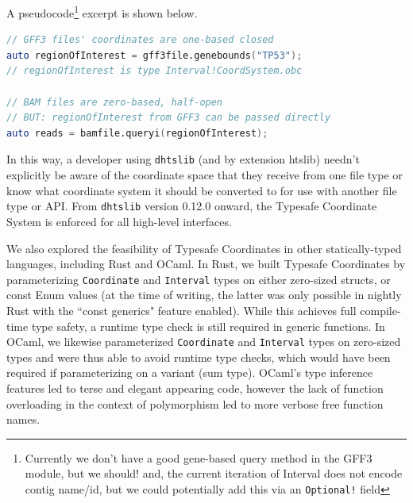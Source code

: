 \documentclass[12pt]{article}
\begin{document}
\filbreak
A pseudocode\footnote{Currently we don't have a good gene-based query method in the GFF3 module, but we should! and, the current iteration of Interval does not encode contig name/id, but we could potentially add this via an \texttt{Optional!} field} excerpt is shown below.\\

\begin{lstlisting}[language=D,frame=single,basicstyle=\ttfamily\small]
// GFF3 files' coordinates are one-based closed
auto regionOfInterest = gff3file.genebounds("TP53");
// regionOfInterest is type Interval!CoordSystem.obc

// BAM files are zero-based, half-open
// BUT: regionOfInterest from GFF3 can be passed directly
auto reads = bamfile.queryi(regionOfInterest);
\end{lstlisting}


In this way, a developer using \texttt{dhtslib} (and by extension htslib) needn't explicitly be aware of the coordinate space that they receive from one file type or know what coordinate system it should be converted to for use with another file type or API. From \texttt{dhtslib} version 0.12.0 onward, the Typesafe Coordinate System is enforced for all high-level interfaces.

We also explored the feasibility of Typesafe Coordinates in other statically-typed languages, including Rust and OCaml. In Rust, we built Typesafe Coordinates by parameterizing \texttt{Coordinate} and \texttt{Interval} types on either zero-sized structs, or const Enum values (at the time of writing, the latter was only possible in nightly Rust with the ``const generics" feature enabled). While this achieves full compile-time type safety, a runtime type check is still required in generic functions. In OCaml, we likewise parameterized \texttt{Coordinate} and \texttt{Interval} types on zero-sized types and were thus able to avoid runtime type checks, which would have been required if parameterizing on a variant (sum type). OCaml's type inference features led to terse and elegant appearing code, however the lack of function overloading in the context of polymorphism led to more verbose free function names.
\end{document}
